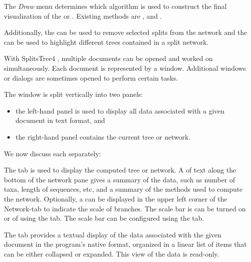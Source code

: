\documentclass[11pt]{article}
\def\SplitsTree{{\sf SplitsTree4 }}
\begin{document}
The {\em Draw} menu determines which algorithm is used
to construct the final visualization of the  or
.
Existing methods
are ,  and  .
Additionally,  the  can be used to
remove selected splits from the network and the
 can be used to highlight different trees
contained in a split network.


With \SplitsTree, multiple documents can be opened and worked on
simultaneously. Each document is represented by a  window.
Additional
windows or dialogs are sometimes opened to perform certain tasks.

The  window is split vertically into two panels:
\begin{itemize}
\item the left-hand  panel is used to display  all data associated
with a given document in text format, and
\item the right-hand  panel contains the current tree or network.
\end{itemize}

We now discuss each separately:


The  tab is used to display the computed tree or network.
A  of text along the bottom of the network pane gives a
summary of the data, such as number of taxa, length of sequences, etc, and
a summary of the methods used to compute the network.
Optionally, a  can be displayed in the upper left
corner of the Network-tab to indicate the scale of branches.
The scale bar is can be turned on or of using the
 tab.
The scale bar can be configured using the
 tab.


The  tab provides a textual display of the data associated with
the given document in the program's native  format, organized in a
linear list of items that can be either collapsed or expanded.
This view of the data is read-only.


\end{document}
